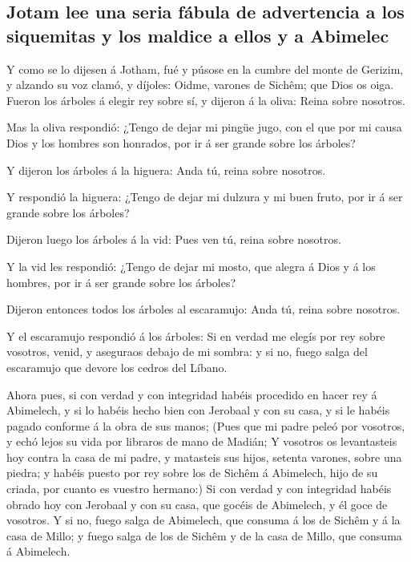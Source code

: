 \hypertarget{jotam-lee-una-seria-fuxe1bula-de-advertencia-a-los-siquemitas-y-los-maldice-a-ellos-y-a-abimelec}{%
\subsection{Jotam lee una seria fábula de advertencia a los siquemitas y
los maldice a ellos y a
Abimelec}\label{jotam-lee-una-seria-fuxe1bula-de-advertencia-a-los-siquemitas-y-los-maldice-a-ellos-y-a-abimelec}}

 Y como se lo dijesen á Jotham, fué y púsose en la cumbre
del monte de Gerizim, y alzando su voz clamó, y díjoles: Oidme, varones
de Sichêm; que Dios os oiga.  Fueron los árboles á elegir
rey sobre sí, y dijeron á la oliva: Reina sobre nosotros.

 Mas la oliva respondió: ¿Tengo de dejar mi pingüe jugo,
con el que por mi causa Dios y los hombres son honrados, por ir á ser
grande sobre los árboles?

 Y dijeron los árboles á la higuera: Anda tú, reina sobre
nosotros.

 Y respondió la higuera: ¿Tengo de dejar mi dulzura y mi
buen fruto, por ir á ser grande sobre los árboles?

 Dijeron luego los árboles á la vid: Pues ven tú, reina
sobre nosotros.

 Y la vid les respondió: ¿Tengo de dejar mi mosto, que
alegra á Dios y á los hombres, por ir á ser grande sobre los árboles?

 Dijeron entonces todos los árboles al escaramujo: Anda
tú, reina sobre nosotros.

 Y el escaramujo respondió á los árboles: Si en verdad me
elegís por rey sobre vosotros, venid, y aseguraos debajo de mi sombra: y
si no, fuego salga del escaramujo que devore los cedros del Líbano.

 Ahora pues, si con verdad y con integridad habéis
procedido en hacer rey á Abimelech, y si lo habéis hecho bien con
Jerobaal y con su casa, y si le habéis pagado conforme á la obra de sus
manos;  (Pues que mi padre peleó por vosotros, y echó
lejos su vida por libraros de mano de Madián;  Y vosotros
os levantasteis hoy contra la casa de mi padre, y matasteis sus hijos,
setenta varones, sobre una piedra; y habéis puesto por rey sobre los de
Sichêm á Abimelech, hijo de su criada, por cuanto es vuestro hermano:)
 Si con verdad y con integridad habéis obrado hoy con
Jerobaal y con su casa, que gocéis de Abimelech, y él goce de vosotros.
 Y si no, fuego salga de Abimelech, que consuma á los de
Sichêm y á la casa de Millo; y fuego salga de los de Sichêm y de la casa
de Millo, que consuma á Abimelech.

